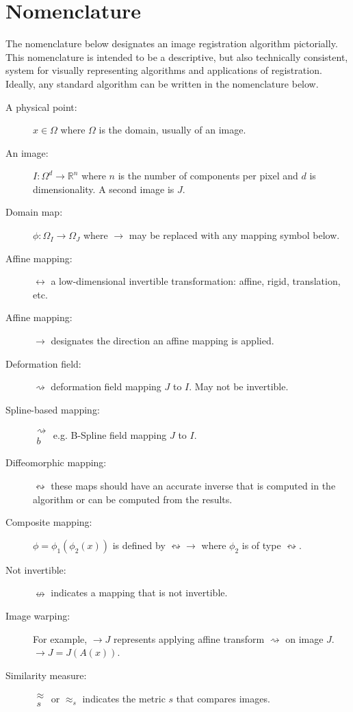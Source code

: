 \documentclass{llncs}
\begin{document}
\section{Nomenclature}
The nomenclature below designates an image registration
algorithm pictorially.  This nomenclature is intended to be a
descriptive, but also technically consistent, system for visually
representing algorithms and applications of registration.  Ideally,
any standard algorithm can be written in the nomenclature below.
\begin{description}
\item [A physical point:] $x \in \Omega$ where $\Omega$ is the domain,
  usually of an image.
\item [An image:]  $ I \colon \Omega^d \to \mathbb{R}^n$ where $n$ is the
  number of components per pixel and $d$ is dimensionality.  A second
  image is $J$. 
\item [Domain map:] $ \phi \colon \Omega_I \to \Omega_J $ where $\to$ may be
  replaced with any mapping symbol below. 
\item [Affine mapping:] $\leftrightarrow$ a low-dimensional invertible 
  transformation: affine, rigid, translation, etc. 
\item [Affine mapping:] $\rightarrow$ designates the direction an
  affine mapping is applied.  
\item [Deformation field:] $ \rightsquigarrow$ deformation field mapping $J$
  to $I$.  May not be invertible.
\item [Spline-based mapping:] $\substack{
   \rightsquigarrow \\
   b
  }$ e.g. B-Spline field mapping $J$
  to $I$.
\item [Diffeomorphic mapping:] $ \leftrightsquigarrow$ these maps
  should have an accurate inverse that is computed in the algorithm or can be computed from the results.
\item [Composite mapping:] $\phi=\phi_1(\phi_2(x))$ is defined by
  $ \leftrightsquigarrow \rightarrow $ where $\phi_2$ is of type
  $\leftrightsquigarrow$. 
\item[Not invertible:]  $\nleftrightarrow$ indicates a mapping that is
  not invertible.
\item [Image warping:] For example, $ \rightarrow J$ represents
applying affine transform $\rightsquigarrow$ on image $J$.
$\rightarrow J = J( A( x ) ) $.
\item [Similarity measure:] $\substack{
   \approx \\
   s
  }$ or $\approx_s$ indicates the metric $s$ that compares images.

\end{description}
\end{document}
